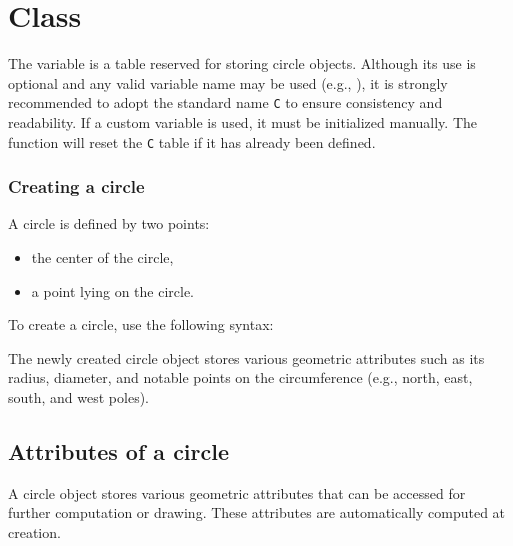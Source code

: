 \newpage
\section{Class }

The  variable is a table reserved for storing circle objects. Although its use is optional and any valid variable name may be used (e.g., ), it is strongly recommended to adopt the standard name \texttt{C} to ensure consistency and readability. If a custom variable is used, it must be initialized manually. The  function will reset the \texttt{C} table if it has already been defined.


\subsubsection{Creating a circle}
\label{ssub:creating_a_circle}
A circle is defined by two points:
\begin{itemize}
\item the center of the circle,
\item a point lying on the circle.
\end{itemize}
\vspace{0.5em}

To create a circle, use the following syntax:
\begin{mybox}
\end{mybox}

The newly created circle object stores various geometric attributes such as its radius, diameter, and notable points on the circumference (e.g., north, east, south, and west poles).

\subsection{Attributes of a circle}

A circle object stores various geometric attributes that can be accessed for further computation or drawing. These attributes are automatically computed at creation.

\vspace{1em}

